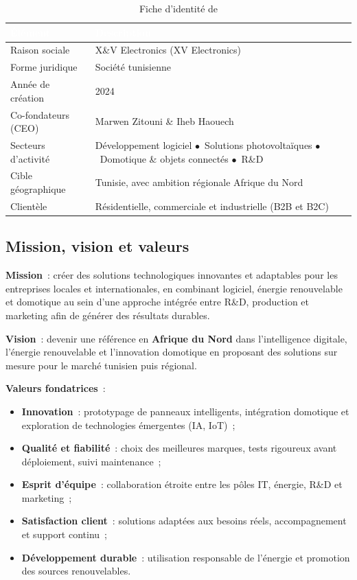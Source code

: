\begin{table}[H]
  \caption{Fiche d'identité de \organisme}
  \label{tab:fiche-entreprise}
  \centering\small
  \begin{tabularx}{\textwidth}{|L{4.2cm}|X|}
    \hline
    \textcolor{white}{\textbf{Élément}} &
    \textcolor{white}{\textbf{Description}} \\
    \hline
    Raison sociale & X\&V Electronics (XV Electronics) \\
    \hline
    Forme juridique & Société tunisienne \\
    \hline
    Année de création & 2024 \\
    \hline
    Co-fondateurs (CEO) & Marwen Zitouni \& Iheb Haouech \\
    \hline
    Secteurs d'activité &
    Développement logiciel \(\bullet\)~Solutions photovoltaïques
    \(\bullet\)~Domotique \& objets connectés \(\bullet\)~R\&D \\
    \hline
    Cible géographique &
    Tunisie, avec ambition régionale Afrique du Nord \\
    \hline
    Clientèle &
    Résidentielle, commerciale et industrielle (B2B et B2C) \\
    \hline
  \end{tabularx}
\end{table}

\subsection{Mission, vision et valeurs}

\noindent\textbf{Mission}~: créer des solutions technologiques innovantes
et adaptables pour les entreprises locales et internationales, en
combinant logiciel, énergie renouvelable et domotique au sein d'une
approche intégrée entre R\&D, production et marketing afin de générer
des résultats durables.

\noindent\textbf{Vision}~: devenir une référence en \textbf{Afrique du Nord}
dans l'intelligence digitale, l'énergie renouvelable et l'innovation
domotique en proposant des solutions sur mesure pour le marché tunisien
puis régional.

\noindent\textbf{Valeurs fondatrices}~:
\begin{itemize}
  \item \textbf{Innovation}~: prototypage de panneaux intelligents,
    intégration domotique et exploration de technologies émergentes
    (IA, IoT)~;
  \item \textbf{Qualité et fiabilité}~: choix des meilleures marques,
    tests rigoureux avant déploiement, suivi maintenance~;
  \item \textbf{Esprit d'équipe}~: collaboration étroite entre les pôles
    IT, énergie, R\&D et marketing~;
  \item \textbf{Satisfaction client}~: solutions adaptées aux besoins
    réels, accompagnement et support continu~;
  \item \textbf{Développement durable}~: utilisation responsable de
    l'énergie et promotion des sources renouvelables.
\end{itemize}

